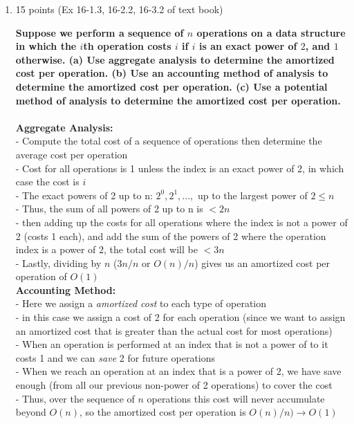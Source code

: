 \documentclass[letterpaper,12pt]{article}
\begin{document}
\begin{enumerate}
\item 15 points (Ex 16-1.3, 16-2.2, 16-3.2 of text book)

\textbf{Suppose we perform a sequence of $n$ operations on a data structure in which the
$i$th operation costs $i$ if $i$ is an exact power of $2$, and $1$ otherwise. (a)
Use aggregate analysis to determine the amortized cost per operation. (b) Use an
accounting method of analysis to determine the amortized cost per operation. (c)
Use a potential method of analysis to determine the amortized cost per operation.} \\ \\

\textbf{Aggregate Analysis:} \\
- Compute the total cost of a sequence of operations then determine the average cost per operation \\
- Cost for all operations is 1 unless the index is an exact power of 2, in which case the cost is $i$ \\
- The exact powers of 2 up to n: $2^0, 2^1, ...,$ up to the largest power of $2 \leq n$ \\
- Thus, the sum of all powers of 2 up to n is $< 2n$ \\
- then adding up the costs for all operations where the index is not a power of 2 (costs 1 each), and add the sum of the powers of 2 where the operation index is a power of 2, the total cost will be $< 3n$ \\
- Lastly, dividing by $n$ ($3n/n$ or $O(n)/n$) gives us an amortized cost per operation of $O(1)$ \\

\textbf{Accounting Method:} \\
- Here we assign a \textit{amortized cost} to each type of operation \\
- in this case we assign a cost of 2 for each operation (since we want to assign an amortized cost that is greater than the actual cost for most operations) \\
- When an operation is performed at an index that is not a power of to it costs 1 and we can \textit{save} 2 for future operations \\
- When we reach an operation at an index that is a power of 2, we have save enough (from all our previous non-power of 2 operations) to cover the cost \\
- Thus, over the sequence of $n$ operations this cost will never accumulate beyond $O(n)$, so the amortized cost per operation is $O(n)/n) \to O(1)$ \\


\end{enumerate}
\end{document}
